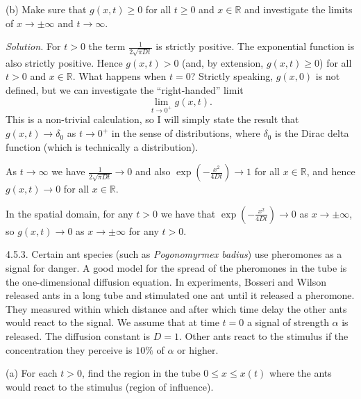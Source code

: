 \documentclass{article}
\newcommand{\R}{\mathbb{R}}
\begin{document}
(b) Make sure that $g(x, t) \geq 0$ for all $t \geq 0$ and $x \in \R$ and
investigate the limits of $x \to \pm \infty$ and $t \to \infty$.

\textit{Solution.}
For $t > 0$ the term $\frac{1}{2 \sqrt{\pi D t}}$ is strictly positive.
The exponential function is also strictly positive. Hence $g(x, t) > 0$
(and, by extension, $g(x, t) \geq 0$) for all $t > 0$ and $x \in \R$.
What happens when $t = 0$? Strictly speaking, $g(x, 0)$ is not defined,
but we can investigate the ``right-handed'' limit
%
\begin{equation*}
    \lim_{t \to 0^+} g(x, t)
    .
\end{equation*}
%
This is a non-trivial calculation, so I will simply state the result
that $g(x, t) \to \delta_0$ as $t \to 0^+$ in the sense of distributions,
where $\delta_0$ is the Dirac delta function (which is technically a
distribution).

As $t \to \infty$ we have $\frac{1}{2 \sqrt{\pi D t}} \to 0$ and also
$\exp ( - \frac{x^2}{4 D t} ) \to 1$ for all $x \in \R$, and
hence $g(x, t) \to 0$ for all $x \in \R$.

In the spatial domain, for any $t > 0$ we have that
$\exp ( - \frac{x^2}{4 D t} ) \to 0$ as $x \to \pm \infty$, so
$g(x, t) \to 0$ as $x \to \pm \infty$ for any $t > 0$.


\newpage

4.5.3. Certain ant species (such as \textit{Pogonomyrmex badius}) use
pheromones as a signal for danger. A good model for the spread of the
pheromones in the tube is the one-dimensional diffusion equation. In
experiments, Bosseri and Wilson released ants in a long tube and stimulated
one ant until it released a pheromone. They measured within which distance
and after which time delay the other ants would react to the signal.
We assume that at time $t = 0$ a signal of strength $\alpha$ is released.
The diffusion constant is $D = 1$. Other ants react to the stimulus if the
concentration they perceive is $10\%$ of $\alpha$ or higher.

(a) For each $t > 0$, find the region in the tube $0 \leq x \leq x(t)$ where
the ants would react to the stimulus (region of influence).
\end{document}
